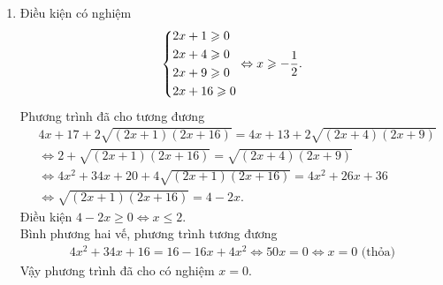 \begin{bt}
{\begin{enumerate}
			\item Điều kiện có nghiệm
			\begin{align*}
				\left\{\begin{aligned}
					& 2x + 1 \geqslant 0 \\
					& 2x + 4 \geqslant 0 \\
					& 2x + 9 \geqslant 0 \\
					& 2x + 16 \geqslant 0\end{aligned}\right.
				\Leftrightarrow x \geqslant -\dfrac{1}{2}.
			\end{align*}
			Phương trình đã cho tương đương
			\begin{align*}
				& 4x + 17 + 2\sqrt{\left(2x + 1\right)\left(2x + 16\right)} = 4x + 13 + 2\sqrt{\left(2x + 4\right)\left(2x + 9\right)}\\
				& \Leftrightarrow 2 + \sqrt{\left(2x + 1\right)\left(2x + 16\right)} = \sqrt{\left(2x + 4\right)\left(2x + 9\right)}\\
				& \Leftrightarrow 4x^2 + 34x + 20 + 4\sqrt{\left(2x + 1\right)\left(2x + 16\right)} = 4x^2 + 26x + 36 \\
				& \Leftrightarrow \sqrt{\left(2x + 1\right)\left(2x + 16\right)} = 4 - 2x.
			\end{align*}
			Điều kiện $ 4 - 2x \geqslant 0 \Leftrightarrow x \leqslant 2 $.\\
			Bình phương hai vế, phương trình tương đương
			\begin{align*}
				4x^2 + 34x + 16 = 16 - 16x + 4x^2
				\Leftrightarrow 50x = 0
				\Leftrightarrow x = 0 \text{ (thỏa)}
			\end{align*}
			Vậy phương trình đã cho có nghiệm $ x = 0 $.
			

\end{enumerate}}
\end{bt}
